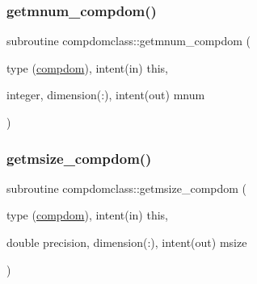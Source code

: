 \mbox{\label{namespacecompdomclass_a4742fe5698151e1e31e2261798a433c8}} 
\subsubsection{\texorpdfstring{getmnum\_compdom()}{getmnum\_compdom()}}
{\footnotesize\ttfamily subroutine compdomclass\+::getmnum\+\_\+compdom (\begin{DoxyParamCaption}\item[{type (\mbox{\hyperlink{namespacecompdomclass_structcompdomclass_1_1compdom}{compdom}}), intent(in)}]{this,  }\item[{integer, dimension(\+:), intent(out)}]{mnum }\end{DoxyParamCaption})}

\mbox{\label{namespacecompdomclass_a460a22916802ee9041aa66d1922cb812}} 
\subsubsection{\texorpdfstring{getmsize\_compdom()}{getmsize\_compdom()}}
{\footnotesize\ttfamily subroutine compdomclass\+::getmsize\+\_\+compdom (\begin{DoxyParamCaption}\item[{type (\mbox{\hyperlink{namespacecompdomclass_structcompdomclass_1_1compdom}{compdom}}), intent(in)}]{this,  }\item[{double precision, dimension(\+:), intent(out)}]{msize }\end{DoxyParamCaption})}

